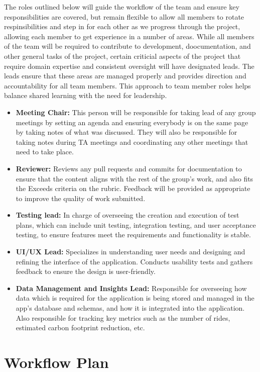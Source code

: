 \documentclass{article}
\begin{document}
The roles outlined below will guide the workflow of the team and ensure key responsibilities are covered, but remain flexible to allow all members to rotate respinsibilities
and step in for each other as we progress through the project, allowing each member to get experience in a number of areas. While all members of the team
will be required to contribute to development, doocumentation, and other general tasks of the project, certain criticial aspects of the project that require 
domain expertise and consistent oversight will have designated leads. The leads ensure that these areas are managed properly and provides direction and accountability for all team members.
This approach to team member roles helps balance shared learning with the need for leadership.
\begin{itemize}
  \item {\bf Meeting Chair:} This person will be responsible for taking lead of any group meetings by setting an agenda and ensuring
        everybody is on the same page by taking notes of what was discussed. They will also be responsible for taking notes during TA meetings
        and coordinating any other meetings that need to take place.
  \item {\bf Reviewer:} Reviews any pull requests and commits for documentation to ensure that the content aligns with the rest of the group's work, 
        and also fits the Exceeds criteria on the rubric. Feedback will be provided as appropriate to improve the quality of work submitted.
  \item {\bf Testing lead:} In charge of overseeing the creation and execution of test plans, which can include unit testing, integration testing, and user acceptance testing, to ensure features meet the requirements and functionality is stable. 
  \item {\bf UI/UX Lead:} Specializes in understanding user needs and designing and refining the interface of the application. Conducts usability tests
        and gathers feedback to ensure the design is user-friendly. 
  \item {\bf Data Management and Insights Lead:} Responsible for overseeing how data which is required for the application is being stored and managed
        in the app's database and schemas, and how it is integrated into the application. Also responsible for tracking key metrics such as the number of rides,
        estimated carbon footprint reduction, etc.
\end{itemize} 

\section{Workflow Plan}
\end{document}
